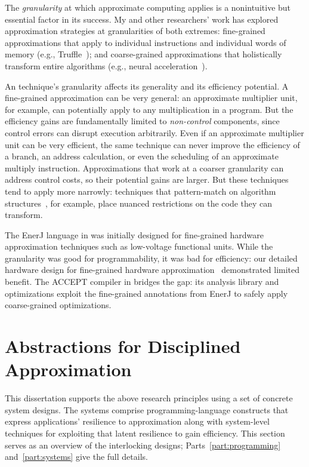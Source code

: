 The \emph{granularity} at which approximate computing applies is a
nonintuitive but essential factor in its success.
My and other researchers' work has explored approximation strategies at
granularities of both extremes:
fine-grained approximations that apply to individual instructions and
individual words of memory (e.g., Truffle~\cite{truffle});
and coarse-grained approximations that holistically transform entire
algorithms (e.g., neural acceleration~\cite{npu}).

An technique's granularity affects its
generality and its efficiency potential.
A fine-grained approximation can be very general:
an approximate multiplier unit, for example, can potentially apply to any
multiplication in a program.
But the efficiency gains are fundamentally limited to \emph{non-control} components,
since control errors can disrupt execution arbitrarily.
Even if an approximate multiplier unit can be very efficient,
the same technique can never
improve the efficiency of a branch, an address calculation,
or even the
scheduling of an approximate multiply instruction.
Approximations that work at a coarser granularity can address control costs,
so their potential gains are larger.
But these techniques tend to apply more narrowly:
techniques that pattern-match on algorithm structures~\cite{paraprox},
for example, place nuanced restrictions on the code they can transform.

The EnerJ language in  was initially designed for
fine-grained hardware approximation techniques such as low-voltage functional
units.
While the granularity was good for programmability, it was bad for efficiency:
our detailed hardware design for fine-grained hardware
approximation~\cite{truffle} demonstrated limited benefit.
The ACCEPT compiler in  bridges the gap: its analysis
library and optimizations exploit the fine-grained annotations from EnerJ to
safely apply coarse-grained optimizations.


\section{Abstractions for Disciplined Approximation}

This dissertation supports the above research principles using a set of
concrete system designs.
The systems comprise programming-language constructs that express
applications' resilience to approximation along with system-level
techniques for exploiting that latent resilience to gain efficiency.
This section serves as an overview of the interlocking designs;
Parts~\ref{part:programming} and~\ref{part:systems} give the full details.

